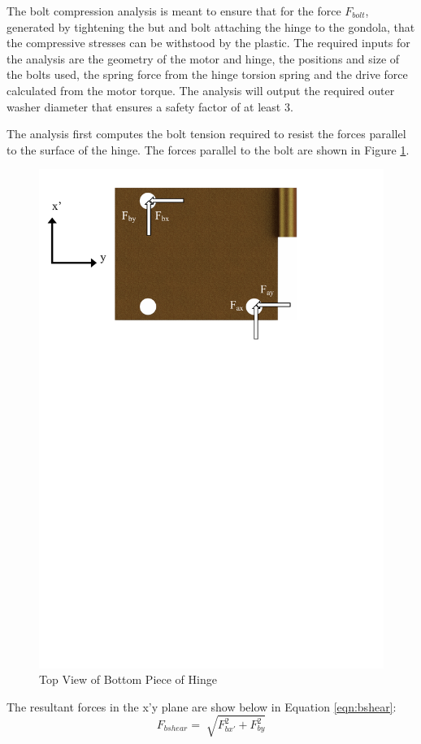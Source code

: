 \documentclass[../main.tex]{subfiles}
\begin{document}
The bolt compression analysis is meant to ensure that for the force $F_{bolt}$, generated by tightening the but and bolt attaching the hinge to the gondola, that the compressive stresses can be withstood by the plastic. The required inputs for the analysis are the geometry of the motor and hinge, the positions and size of the bolts used, the spring force from the hinge torsion spring and the drive force calculated from the motor torque. The analysis will output the required outer washer diameter that ensures a safety factor of at least 3. 
  
The analysis first computes the bolt tension required to resist the forces parallel to the surface of the hinge. The forces parallel to the bolt are shown in Figure \ref{fig:hingeForce}.
\begin{figure}[H]
	\centering
	\includegraphics[width=1\textwidth]{img/gondola/hingeForces.pdf}
	\caption{Top View of Bottom Piece of Hinge}
	\label{fig:hingeForce}
\end{figure}
The resultant forces in the x'y plane are show below in Equation \ref{eqn:bshear}:
\begin{displaymath}
\label{eqn:bshear}
F_{bshear} = \sqrt[]{F_{bx'}^2 + F_{by}^2}
\end{displaymath}
\end{document}
